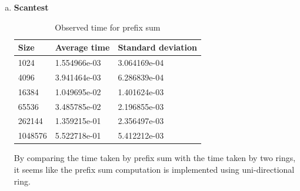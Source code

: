 \documentclass[10pt,letterpaper]{article}
\begin{document}
\begin{enumerate}[(a)]
\item \textbf{Scantest}\\[10pt]
\begin{table}[h]
\centering
\begin{tabular}{lll}\hline
Size    & Average time & Standard deviation \\\hline
1024    & 1.554966e-03 & 3.064169e-04       \\
4096    & 3.941464e-03 & 6.286839e-04       \\
16384   & 1.049695e-02 & 1.401624e-03       \\
65536   & 3.485785e-02 & 2.196855e-03       \\
262144  & 1.359215e-01 & 2.356497e-03       \\
1048576 & 5.522718e-01 & 5.412212e-03      \\\hline
\end{tabular}
\caption{Observed time for prefix sum}
\end{table}


By comparing the time taken by prefix sum with the time taken by two rings, it seems like the prefix sum computation is implemented using uni-directional ring.
\end{enumerate}
\end{document}
